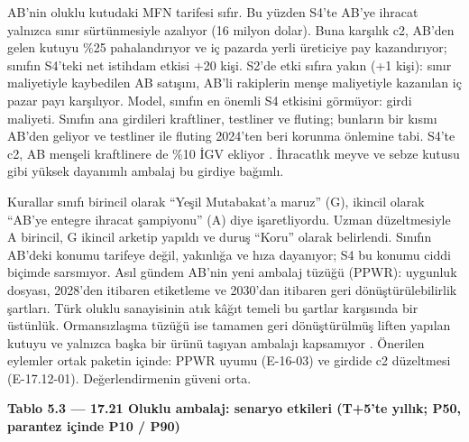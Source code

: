 AB'nin oluklu kutudaki MFN tarifesi sıfır. Bu yüzden S4'te AB'ye ihracat yalnızca sınır sürtünmesiyle azalıyor (16 milyon dolar). Buna karşılık c2, AB'den gelen kutuyu \%25 pahalandırıyor ve iç pazarda yerli üreticiye pay kazandırıyor; sınıfın S4'teki net istihdam etkisi +20 kişi. S2'de etki sıfıra yakın (+1 kişi): sınır maliyetiyle kaybedilen AB satışını, AB'li rakiplerin menşe maliyetiyle kazanılan iç pazar payı karşılıyor. Model, sınıfın en önemli S4 etkisini görmüyor: girdi maliyeti. Sınıfın ana girdileri kraftliner, testliner ve fluting; bunların bir kısmı AB'den geliyor ve testliner ile fluting 2024'ten beri korunma önlemine tabi. S4'te c2, AB menşeli kraftlinere de \%10 İGV ekliyor \etiketT{}. İhracatlık meyve ve sebze kutusu gibi yüksek dayanımlı ambalaj bu girdiye bağımlı.

Kurallar sınıfı birincil olarak ``Yeşil Mutabakat'a maruz'' (G), ikincil olarak ``AB'ye entegre ihracat şampiyonu'' (A) diye işaretliyordu. Uzman düzeltmesiyle A birincil, G ikincil arketip yapıldı ve duruş ``Koru'' olarak belirlendi. Sınıfın AB'deki konumu tarifeye değil, yakınlığa ve hıza dayanıyor; S4 bu konumu ciddi biçimde sarsmıyor. Asıl gündem AB'nin yeni ambalaj tüzüğü (PPWR): uygunluk dosyası, 2028'den itibaren etiketleme ve 2030'dan itibaren geri dönüştürülebilirlik şartları. Türk oluklu sanayisinin atık kâğıt temeli bu şartlar karşısında bir üstünlük. Ormansızlaşma tüzüğü ise tamamen geri dönüştürülmüş liften yapılan kutuyu ve yalnızca başka bir ürünü taşıyan ambalajı kapsamıyor \etiketV{}. Önerilen eylemler ortak paketin içinde: PPWR uyumu (E-16-03) ve girdide c2 düzeltmesi (E-17.12-01). Değerlendirmenin güveni orta.


\textbf{Tablo 5.3 --- 17.21 Oluklu ambalaj: senaryo etkileri (T+5'te yıllık; P50, parantez içinde P10 / P90)}

\nopagebreak[4]

\begingroup\gbtablo\small

